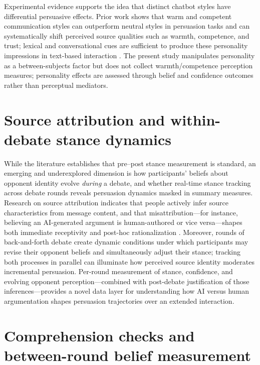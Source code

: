 Experimental evidence supports the idea that distinct chatbot styles have differential persuasive
effects. Prior work shows that warm and competent communication styles can outperform neutral
styles in persuasion tasks and can systematically shift perceived source qualities such as
warmth, competence, and trust; lexical and conversational cues are sufficient to produce these
personality impressions in text-based interaction \cite{schwede2023_can_chatbots_be_persuasive,heppner2024_chatbot_personality_cues}.
The present study manipulates personality as a between-subjects factor but does not collect
warmth/competence perception measures; personality effects are assessed through belief and
confidence outcomes rather than perceptual mediators.

\section{Source attribution and within-debate stance dynamics}

While the literature establishes that pre--post stance measurement is standard, an emerging and
underexplored dimension is how participants' beliefs about opponent identity evolve \textit{during} a
debate, and whether real-time stance tracking across debate rounds reveals persuasion dynamics
masked in summary measures. Research on source attribution indicates that people actively infer
source characteristics from message content, and that misattribution—for instance, believing an
AI-generated argument is human-authored or vice versa—shapes both immediate receptivity and
post-hoc rationalization \cite{schilke2025_transparency_dilemma,montag2023_trust_humans_vs_ai}.
Moreover, rounds of back-and-forth debate create dynamic conditions under which participants
may revise their opponent beliefs and simultaneously adjust their stance; tracking both processes
in parallel can illuminate how perceived source identity moderates incremental persuasion.
Per-round measurement of stance, confidence, and evolving opponent perception—combined with
post-debate justification of those inferences—provides a novel data layer for understanding
how AI versus human argumentation shapes persuasion trajectories over an extended interaction.

\section{Comprehension checks and between-round belief measurement}

